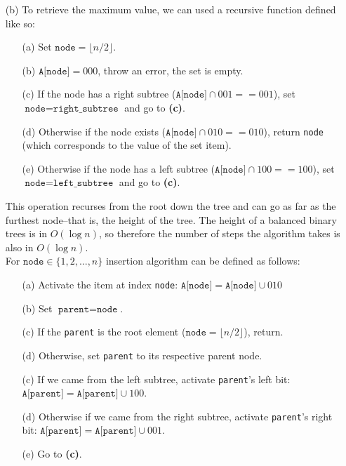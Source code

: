 \documentclass{article}
\begin{document}
\begin{enumerate}
\begin{enumerate}
        \item [(b)] To retrieve the maximum value, we can used a recursive function defined like so:
            \begin{enumerate}
            \item [(a)] Set $\texttt{node} = \lfloor n / 2 \rfloor$.
            \item [(b)] $\texttt{A[node]} = 000$, throw an error, the set is empty.
            \item [(c)] If the node has a right subtree ($\texttt{A[node]} \cap 001 == 001$), set $\texttt{node} = \texttt{right\_subtree}$ and go to \textbf{(c)}.
            \item [(d)] Otherwise if the node exists ($\texttt{A[node]} \cap 010 == 010$), return \texttt{node} (which corresponds to the value of the set item).
            \item [(e)] Otherwise if the node has a left subtree ($\texttt{A[node]} \cap 100 == 100$), set $\texttt{node} = \texttt{left\_subtree}$ and go to \textbf{(c)}.
            \end{enumerate}
            This operation recurses from the root down the tree and can go as far as the furthest node--that is, the height of the tree. The height of a balanced binary trees is in $O(\log n)$, so therefore the number of steps the algorithm takes is also in $O(\log n)$. \\

            For $\texttt{node} \in \{1, 2, ..., n\}$ insertion algorithm can be defined as follows:
            \begin{enumerate}
            \item [(a)] Activate the item at index \texttt{node}: $\texttt{A[node]} = \texttt{A[node]} \cup 010$
            \item [(b)] Set $\texttt{parent} = \texttt{node}$.
            \item [(c)] If the \texttt{parent} is the root element ($\texttt{node} = \lfloor n / 2 \rfloor$), return.
            \item [(d)] Otherwise, set \texttt{parent} to its respective parent node.
            \item [(c)] If we came from the left subtree, activate \texttt{parent}'s left bit: $\texttt{A[parent]} = \texttt{A[parent]} \cup 100$.
            \item [(d)] Otherwise if we came from the right subtree, activate \texttt{parent}'s right bit: $\texttt{A[parent]} = \texttt{A[parent]} \cup 001$.
            \item [(e)] Go to \textbf{(c)}.
            \end{enumerate}


\end{enumerate}
\end{enumerate}
\end{document}
